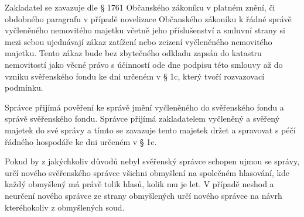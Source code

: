 \documentclass[parskip=half]{scrreprt}
\begin{document}
\begin{contract}

Zakladatel se zavazuje dle § 1761 Občanského zákoníku v platném znění, či obdobného paragrafu v případě novelizace Občanského zákoníku k řádné správě vyčleněného nemovitého majetku včetně jeho příslušenství a smluvní strany si mezi sebou ujednávají zákaz zatížení nebo zcizení vyčleněného nemovitého majetku. Tento zákaz bude bez zbytečného odkladu zapsán do katastru nemovitostí jako věcné právo s účinností ode dne podpisu této smlouvy až do vzniku svěřenského fondu ke dni určeném v § 1c, který tvoří rozvazovací podmínku.



Správce přijímá pověření ke správě jmění vyčleněného do svěřenského fondu a správě svěřenského fondu. Správce přijímá zakladatelem vyčleněný a svěřený majetek do své správy a tímto se zavazuje tento majetek držet a spravovat s péčí řádného hospodáře ke dni určeném v § 1c.

Pokud by z jakýchkoliv důvodů nebyl svěřenský správce schopen ujmou se správy, určí nového svěřenského správce všichni obmyšlení na společném hlasování, kde každý obmyšlený má právě tolik hlasů, kolik mu je let. V případě neshod a neurčení nového správce ze strany obmyšlených určí nového správce na návrh kteréhokoliv z obmyšlených soud.

\parnumbertrue



\end{contract}
\end{document}
